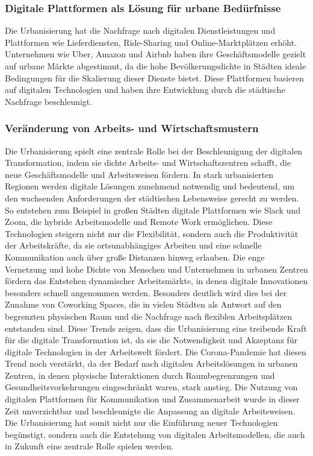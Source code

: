 \documentclass[conference,compsoc,final,a4paper, onecolumn, 11pt]{IEEEtran}
\begin{document}
\subsubsection{ Digitale Plattformen als Lösung für urbane Bedürfnisse}
Die Urbanisierung hat die Nachfrage nach digitalen Dienstleistungen und Plattformen wie Lieferdiensten, Ride-Sharing und Online-Marktplätzen erhöht. 
Unternehmen wie Uber, Amazon und Airbnb haben ihre Geschäftsmodelle gezielt auf urbane Märkte abgestimmt, da die hohe Bevölkerungsdichte in Städten ideale Bedingungen für die Skalierung dieser Dienste bietet. 
Diese Plattformen basieren auf digitalen Technologien und haben ihre Entwicklung durch die städtische Nachfrage beschleunigt.\autocite{global_sustainability_gap}


\subsubsection{ Veränderung von Arbeits- und Wirtschaftsmustern}
Die Urbanisierung spielt eine zentrale Rolle bei der Beschleunigung der digitalen Transformation, indem sie dichte Arbeits- und Wirtschaftszentren schafft, die neue Geschäftsmodelle und Arbeitsweisen fördern. 
In stark urbanisierten Regionen werden digitale Lösungen zunehmend notwendig und bedeutend, um den wachsenden Anforderungen der städtischen Lebensweise gerecht zu werden. 
So entstehen zum Beispiel in großen Städten digitale Plattformen wie Slack und Zoom, die hybride Arbeitsmodelle und Remote Work ermöglichen. 
Diese Technologien steigern nicht nur die Flexibilität, sondern auch die Produktivität der Arbeitskräfte, da sie ortsunabhängiges Arbeiten und eine schnelle Kommunikation auch über große Distanzen hinweg erlauben.
Die enge Vernetzung und hohe Dichte von Menschen und Unternehmen in urbanen Zentren fördern das Entstehen dynamischer Arbeitsmärkte, in denen digitale Innovationen besonders schnell angenommen werden. 
Besonders deutlich wird dies bei der Zunahme von Coworking Spaces, die in vielen Städten als Antwort auf den begrenzten physischen Raum und die Nachfrage nach flexiblen Arbeitsplätzen entstanden sind. 
Diese Trends zeigen, dass die Urbanisierung eine treibende Kraft für die digitale Transformation ist, da sie die Notwendigkeit und Akzeptanz für digitale Technologien in der Arbeitswelt fördert.
Die Corona-Pandemie hat diesen Trend noch verstärkt, da der Bedarf nach digitalen Arbeitslösungen in urbanen Zentren, in denen physische Interaktionen durch Raumbegrenzungen und Gesundheitsvorkehrungen eingeschränkt waren, stark anstieg. 
Die Nutzung von digitalen Plattformen für Kommunikation und Zusammenarbeit wurde in dieser Zeit unverzichtbar und beschleunigte die Anpassung an digitale Arbeitsweisen. 
Die Urbanisierung hat somit nicht nur die Einführung neuer Technologien begünstigt, sondern auch die Entstehung von digitalen Arbeitsmodellen, die auch in Zukunft eine zentrale Rolle spielen werden.\autocite{global_sustainability_gap}
\end{document}
